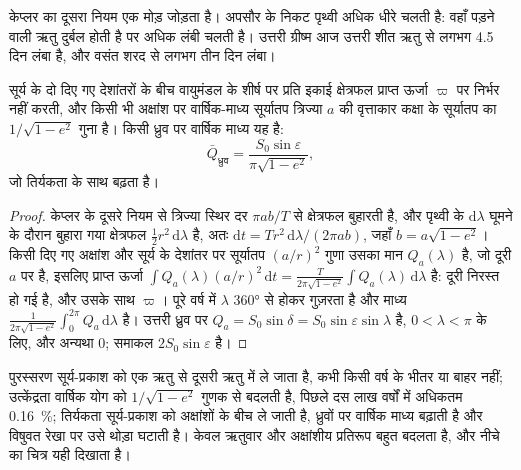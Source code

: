 केप्लर का दूसरा नियम एक मोड़ जोड़ता है। अपसौर के निकट पृथ्वी अधिक धीरे चलती है: वहाँ पड़ने वाली ऋतु
दुर्बल होती है पर अधिक लंबी चलती है। उत्तरी ग्रीष्म आज उत्तरी शीत ऋतु से लगभग 4.5 दिन लंबा है,
और वसंत शरद से लगभग तीन दिन लंबा।

\begin{proposition}\label{prop:b2:orbital-forcing:annual}
सूर्य के दो दिए गए देशांतरों के बीच वायुमंडल के शीर्ष पर प्रति इकाई क्षेत्रफल प्राप्त ऊर्जा
$\varpi$ पर निर्भर नहीं करती, और किसी भी अक्षांश पर वार्षिक-माध्य सूर्यातप त्रिज्या $a$ की
वृत्ताकार कक्षा के सूर्यातप का $1/\sqrt{1 - e^2}$ गुना है। किसी ध्रुव पर वार्षिक माध्य यह है:
\[
  \bar Q_{\text{ध्रुव}} = \frac{S_0\sin\varepsilon}{\pi\sqrt{1 - e^2}} ,
\]
जो तिर्यकता के साथ बढ़ता है।
\end{proposition}

\begin{proof}
केप्लर के दूसरे नियम से त्रिज्या स्थिर दर $\pi ab/T$ से क्षेत्रफल बुहारती है, और
पृथ्वी के $\mathrm d\lambda$ घूमने के दौरान बुहारा गया क्षेत्रफल $\frac12 r^2\,\mathrm d\lambda$ है, अतः $\mathrm dt =
T r^2\,\mathrm d\lambda/(2\pi ab)$, जहाँ $b = a\sqrt{1 - e^2}$। किसी दिए गए अक्षांश
और सूर्य के देशांतर पर सूर्यातप $(a/r)^2$ गुणा उसका मान $Q_a(\lambda)$ है, जो दूरी $a$ पर है, इसलिए
प्राप्त ऊर्जा $\int Q_a(\lambda)(a/r)^2\,\mathrm dt = \frac{T}{2\pi\sqrt{1 - e^2}}\int
Q_a(\lambda)\,\mathrm d\lambda$ है: दूरी निरस्त हो गई है, और उसके साथ $\varpi$। पूरे
वर्ष में $\lambda$ \ang{360} से होकर गुज़रता है और माध्य $\frac{1}{2\pi\sqrt{1-e^2}}\int_0^{2\pi}
Q_a\,\mathrm d\lambda$ है। उत्तरी ध्रुव पर $Q_a = S_0\sin\delta = S_0\sin\varepsilon\sin\lambda$ है, $0 < \lambda < \pi$ के लिए,
और अन्यथा 0; समाकल $2S_0\sin\varepsilon$ है।
\end{proof}

पुरस्सरण सूर्य-प्रकाश को एक ऋतु से दूसरी ऋतु में ले जाता है, कभी किसी वर्ष के भीतर या बाहर नहीं; उत्केंद्रता
वार्षिक योग को $1/\sqrt{1 - e^2}$ गुणक से बदलती है, पिछले दस लाख वर्षों में अधिकतम \qty{0.16}{\percent};
तिर्यकता सूर्य-प्रकाश को अक्षांशों के बीच ले जाती है, ध्रुवों पर वार्षिक माध्य बढ़ाती है और
विषुवत रेखा पर उसे थोड़ा घटाती है। केवल ऋतुवार और अक्षांशीय प्रतिरूप
बहुत बदलता है, और नीचे का चित्र यही दिखाता है।

